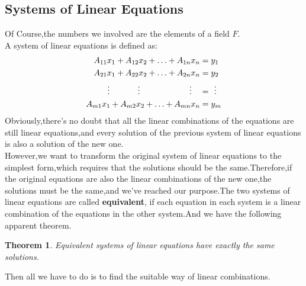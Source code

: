 \documentclass{article}
\begin{document}
\subsection{Systems of Linear Equations}\label{systems of le}
\noindent Of Course,the numbers we involved are the elements of a field $F$.\\
A system of linear equations is defined as:
\begin{align}
	A_{11}x_1+A_{12}x_2+\ldots+A_{1n}x_n&=y_1\notag\\
	A_{21}x_1+A_{22}x_2+\ldots+A_{2n}x_n&=y_2\notag\\
	\vdots\:\,\quad\quad\quad\vdots\quad\quad\quad\qquad\quad\vdots\quad&=\,\:\vdots\notag\\
	A_{m1}x_1+A_{m2}x_2+\ldots+A_{mn}x_n&=y_m\notag
\end{align}
\indent Obviously,there's no doubt that all the linear combinations of the equations are still linear equations,and every solution of the previous system of linear equations is also a solution of the new one.\\
However,we want to transform the original system of linear equations to the simplest form,which requires that the solutions should be the same.Therefore,if the original equations are also the linear combinations of the new one,the solutions must be the same,and we've reached our purpose.The two systems of linear equations are called \textbf{equivalent}, if each equation in each system is a linear combination of the equations in the other system.And we have the following apparent theorem.\\
\theoremstyle{plain}\newtheorem{thm}{Theorem}[section]
\begin{thm}
	Equivalent systems of linear equations have exactly the same solutions.
\end{thm}
Then all we have to do is to find the suitable way of linear combinations.
\end{document}
